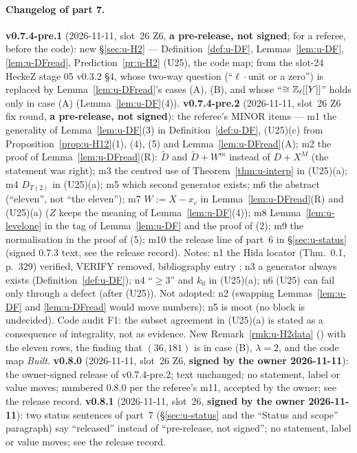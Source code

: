 \documentclass[11pt]{article}
\newcommand{\VERIFYloc}{\textsf{VERIFY}}          %
\newcommand{\Zl}{\Z_\ell}
\begin{document}
\paragraph{Changelog of part 7.} \textbf{v0.7.4-pre.1} (2026-11-11, slot~26 Z6, \textbf{a pre-release, not signed}; for a referee, before the code): new \S\ref{sec:u-H2} --- Definition~\ref{def:u-DF}, Lemmas~\ref{lem:u-DF}, \ref{lem:u-DFread}, Prediction~\ref{pr:u-H2} (U25), the code map; from the slot-24 HeckeZ stage 05 v0.3.2 \S4, whose two-way question (``$\ell\cdot$unit or a zero'') is replaced by Lemma~\ref{lem:u-DFread}'s cases (A), (B), and whose ``$\cong\Zl[[Y]]$'' holds only in case (A) (Lemma~\ref{lem:u-DF}(4)).
\textbf{v0.7.4-pre.2} (2026-11-11, slot~26 Z6 fix round, \textbf{a pre-release, not signed}): the referee's MINOR items --- m1 the generality of Lemma~\ref{lem:u-DF}(3) in
Definition~\ref{def:u-DF}, (U25)(c) from Proposition~\ref{prop:u-H12}(1), (4), (5) and Lemma~\ref{lem:u-DFread}(A); m2 the proof of Lemma~\ref{lem:u-DFread}(R): $\tilde D$ and $\tilde D+W^{m}$
instead of $D+X^{M}$ (the statement was right); m3 the centred use of Theorem~\ref{thm:u-interp} in (U25)(a); m4 $D_{T(2)}$ in (U25)(a); m5 which second generator exists; m6 the abstract
(``eleven'', not ``the eleven''); m7 $W:=X-x_c$ in Lemma~\ref{lem:u-DFread}(R) and (U25)(a) ($Z$ keeps the meaning of Lemma~\ref{lem:u-DF}(4)); m8 Lemma~\ref{lem:u-levelone} in the tag of
Lemma~\ref{lem:u-DF} and the proof of (2); m9 the normalisation in the proof of (5); m10 the release line of part~6 in \S\ref{sec:u-status} (signed 0.7.3 text, see the release record).
Notes: n1 the Hida locator (Thm.~0.1, p.~329) verified, \VERIFYloc{} removed, bibliography entry ; n3 a generator always exists (Definition~\ref{def:u-DF}); n4 ``$\ge3$''
and $k_0$ in (U25)(a); n6 (U25) can fail only through a defect (after (U25)). Not adopted: n2 (swapping Lemmas~\ref{lem:u-DF} and \ref{lem:u-DFread} would move numbers); n5 is moot (no
block is undecided). Code audit F1: the subset agreement in (U25)(a) is stated as a consequence of integrality, not as evidence. New Remark~\ref{rmk:u-H2data} (\COMP) with the eleven rows,
the finding that $(36,181)$ is in case (B), $\lambda=2$, and the code map \emph{Built}.
\textbf{v0.8.0} (2026-11-11, slot~26 Z6, \textbf{signed by the owner 2026-11-11}): the owner-signed release of v0.7.4-pre.2; text unchanged; no statement, label or value moves; numbered 0.8.0 per the referee's m11, accepted by the owner; see the release record.
\textbf{v0.8.1} (2026-11-11, slot~26, \textbf{signed by the owner 2026-11-11}): two status sentences of part~7 (\S\ref{sec:u-status} and the ``Status and scope'' paragraph) say ``released'' instead of ``pre-release, not signed''; no statement, label or value moves; see the release record.
\end{document}
